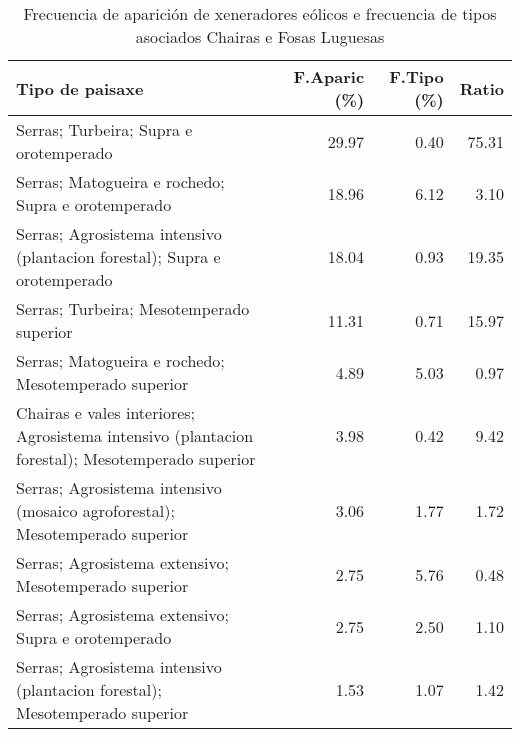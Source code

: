 \begin{table}[p]
\centering
\caption{Frecuencia de aparición de xeneradores eólicos e frecuencia de tipos asociados Chairas e Fosas Luguesas} 
\label{veolico6}
\begin{tabular}{lrrr}
  \hline
Tipo de paisaxe & F.Aparic (\%) & F.Tipo (\%) & Ratio \\ 
  \hline
Serras; Turbeira; Supra e orotemperado & 29.97 & 0.40 & 75.31 \\ 
  Serras; Matogueira e rochedo; Supra e orotemperado & 18.96 & 6.12 & 3.10 \\ 
  Serras; Agrosistema intensivo (plantacion forestal); Supra e orotemperado & 18.04 & 0.93 & 19.35 \\ 
  Serras; Turbeira; Mesotemperado superior & 11.31 & 0.71 & 15.97 \\ 
  Serras; Matogueira e rochedo; Mesotemperado superior & 4.89 & 5.03 & 0.97 \\ 
  Chairas e vales interiores; Agrosistema intensivo (plantacion forestal); Mesotemperado superior & 3.98 & 0.42 & 9.42 \\ 
  Serras; Agrosistema intensivo (mosaico agroforestal); Mesotemperado superior & 3.06 & 1.77 & 1.72 \\ 
  Serras; Agrosistema extensivo; Mesotemperado superior & 2.75 & 5.76 & 0.48 \\ 
  Serras; Agrosistema extensivo; Supra e orotemperado & 2.75 & 2.50 & 1.10 \\ 
  Serras; Agrosistema intensivo (plantacion forestal); Mesotemperado superior & 1.53 & 1.07 & 1.42 \\ 
   \hline
\end{tabular}
\end{table}

